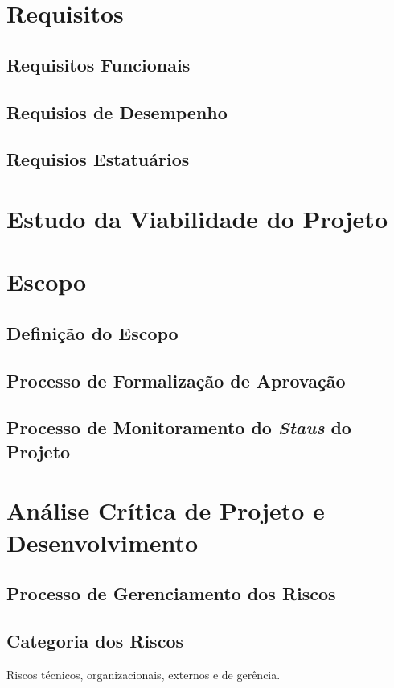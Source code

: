 \section{Requisitos}
\subsection{Requisitos Funcionais}
\subsection{Requisios de Desempenho}
\subsection{Requisios Estatuários}

\section{Estudo da Viabilidade do Projeto}

\section{Escopo}
\subsection{Definição do Escopo}
\subsection{Processo de Formalização de Aprovação}
\subsection{Processo de Monitoramento do \textit{Staus} do Projeto}

\section{Análise Crítica de Projeto e Desenvolvimento}
\subsection{Processo de Gerenciamento dos Riscos}
\subsection{Categoria dos Riscos}
Riscos técnicos, organizacionais, externos e de gerência.

